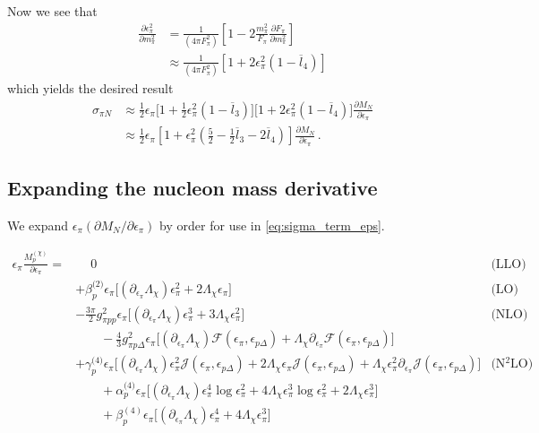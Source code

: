 \documentclass[12pt,tightenlines, raggedbottom, prd, notitlepage]{revtex4-1}
\begin{document}
Now we see that
\begin{align}
\frac{\partial \epsilon_\pi^2}{\partial m_\pi^2} 
&=  \frac{1}{(4 \pi F_\pi^2)} \left[ 1 - 2 \frac{m_\pi^2}{F_\pi} \frac{\partial F_\pi}{\partial m_\pi^2} \right] \nonumber \\
&\approx  \frac{1}{(4 \pi F_\pi^2)} \left[ 1 + 2 \epsilon_\pi^2 \left(1 - \overline l_4 \right) \right]
\end{align}
which yields the desired result
\begin{align} \label{eq:sigma_term_eps}
\sigma_{\pi N} &\approx
\frac 12 \epsilon_\pi \Big[ 1 + \frac 12 \epsilon_\pi^2 \left(1 - \overline l_3 \right) \Big] 
\Big[ 1 + 2 \epsilon_\pi^2 \left(1 - \overline l_4 \right) \Big] \frac{\partial M_N}{\partial \epsilon_\pi}\nonumber \\
&\approx \frac 12 \epsilon_\pi \left[ 1 + \epsilon_\pi^2 \left( \frac 52 - \frac 12 \overline l_3 - 2 \overline l_4 \right) \right] \frac{\partial M_N}{\partial \epsilon_\pi} \, .
\end{align}


\subsection{Expanding the nucleon mass derivative}

We expand $\epsilon_\pi (\partial M_N / \partial \epsilon_\pi)$ by order for use in \eqref{eq:sigma_term_eps}.

\begin{align*}
    \epsilon_\pi \frac{M_p^{(\chi)}}{\partial \epsilon_\pi }  = &\phantom{+}  0 & \text{(LLO)} \\
    &+ \beta^\text{(2)}_p \epsilon_\pi \Big[
        (\partial_{\epsilon_\pi}\Lambda_\chi) \epsilon_\pi^2
        + 2\Lambda_\chi \epsilon_\pi 
    \Big] & \text{(LO)} \\
    &- \frac{3\pi}{2} g_{\pi pp}^2 \epsilon_\pi \Big[
        (\partial_{\epsilon_\pi}\Lambda_\chi)  \epsilon_\pi^3
        + 3 \Lambda_\chi \epsilon_\pi^2 
    \Big] & \text{(NLO)} \\
    &\qquad - \frac{4}{3} g_{\pi p\Delta}^2 \epsilon_\pi \Big[
        (\partial_{\epsilon_\pi}\Lambda_\chi) \mathcal{F}(\epsilon_\pi, \epsilon_{p\Delta})
        +\Lambda_\chi \partial_{\epsilon_\pi}\mathcal{F}(\epsilon_\pi, \epsilon_{p\Delta}) 
    \Big] \\
    &+ \gamma_p^\text{(4)} \epsilon_\pi \Big[
        (\partial_{\epsilon_\pi} \Lambda_\chi)\epsilon_\pi^2 \mathcal{J} (\epsilon_\pi, \epsilon_{p \Delta})   + 2 \Lambda_\chi \epsilon_\pi \mathcal{J} (\epsilon_\pi, \epsilon_{p \Delta}) + \Lambda_\chi \epsilon_\pi^2 \partial_{\epsilon_\pi} \mathcal{J} (\epsilon_\pi, \epsilon_{p \Delta}) 
    \Big] &\text{(N$^2$LO)}  \\
    &\qquad + \alpha_p^\text{(4)} \epsilon_\pi \Big[
        (\partial_{\epsilon_\pi} \Lambda_{\chi}) \epsilon_\pi^4 \log{\epsilon_\pi^2} 
        + 4 \Lambda_\chi \epsilon_\pi^3 \log{\epsilon_\pi^2} 
        + 2 \Lambda_\chi \epsilon_\pi^3
    \Big] \\
    &\qquad + \beta_{p}^{(4)} \epsilon_\pi \Big[ 
        (\partial_{\epsilon_\pi} \Lambda_\chi) \epsilon_\pi^4
        + 4\Lambda_\chi \epsilon_\pi^3
    \Big]
\end{align*}
\end{document}
